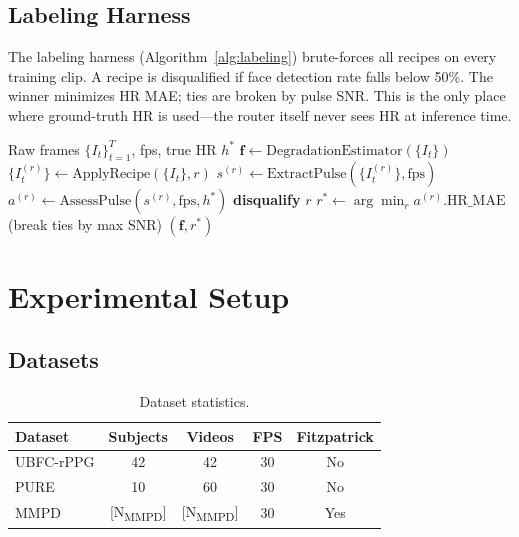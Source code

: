 \documentclass[conference]{IEEEtran}
\begin{document}
\subsection{Labeling Harness}
\label{subsec:labeling}

The labeling harness (Algorithm~\ref{alg:labeling}) brute-forces all recipes on every training clip. A recipe is disqualified if face detection rate falls below 50\%. The winner minimizes HR MAE; ties are broken by pulse SNR. This is the only place where ground-truth HR is used---the router itself never sees HR at inference time.

\begin{algorithm}[t]
\caption{Labeling Harness (per clip)}
\label{alg:labeling}
\begin{algorithmic}[1]
\REQUIRE Raw frames $\{I_t\}_{t=1}^T$, fps, true HR $h^*$
\STATE $\mathbf{f} \leftarrow \text{DegradationEstimator}(\{I_t\})$ 
    \STATE $\{I_t^{(r)}\} \leftarrow \text{ApplyRecipe}(\{I_t\}, r)$
    \STATE $s^{(r)} \leftarrow \text{ExtractPulse}(\{I_t^{(r)}\}, \text{fps})$
    \STATE $a^{(r)} \leftarrow \text{AssessPulse}(s^{(r)}, \text{fps}, h^*)$
        \STATE \textbf{disqualify} $r$
    \ENDIF
\ENDFOR
\STATE $r^* \leftarrow \arg\min_r a^{(r)}.\text{HR\_MAE}$ (break ties by max SNR)
\RETURN $(\mathbf{f}, r^*)$
\end{algorithmic}
\end{algorithm}

\section{Experimental Setup}
\label{sec:experiments}

\subsection{Datasets}
\label{subsec:datasets}

\begin{table}[t]
\centering
\caption{Dataset statistics.}
\label{tab:datasets}
\begin{tabular}{@{}lcccc@{}}
\toprule
Dataset & Subjects & Videos & FPS & Fitzpatrick \\
\midrule
UBFC-rPPG \cite{bobbia2019unsupervised} & 42 & 42 & 30 & No \\
PURE \cite{stricker2014non} & 10 & 60 & 30 & No \\
MMPD \cite{niu2023mmpd} & [N\textsubscript{MMPD}] & [N\textsubscript{MMPD}] & 30 & Yes \\
\bottomrule
\end{tabular}
\end{table}
\end{document}
